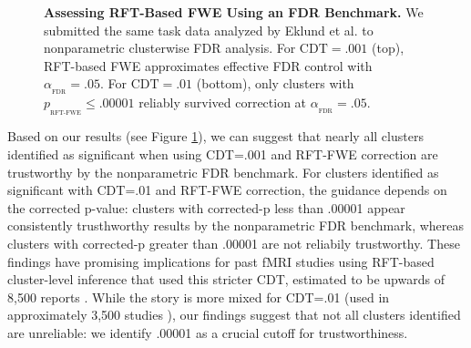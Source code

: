 \documentclass[9pt,twocolumn,twoside]{pnas-new}
\newcommand{\subtext}[2]{
#1_{_{\text{#2}}}
}
\begin{document}
\begin{figure}[ht]
\centering
\caption{
\textbf{Assessing RFT-Based FWE Using an FDR Benchmark.}
We submitted the same task data analyzed by Eklund et al. \cite{eklund_cluster_2016,tom_neural_2007,poldrack_toward_2013} to nonparametric clusterwise FDR analysis. For $\text{CDT}=.001$ (top), RFT-based FWE approximates effective FDR control with $\subtext{\alpha}{FDR} = .05$. For $\text{CDT}=.01$ (bottom), only clusters with $\subtext{p}{RFT-FWE} \leq .00001$ reliably survived correction at $\subtext{\alpha}{FDR}=.05$. 
\label{fig:p-plot}
}
\end{figure}

Based on our results (see Figure \ref{fig:p-plot}), we can suggest that nearly all clusters identified as significant when using CDT=.001 and RFT-FWE correction are trustworthy by the nonparametric FDR benchmark.
For clusters identified as significant with CDT=.01 and RFT-FWE correction, the guidance depends on the corrected p-value: clusters with corrected-p less than .00001 appear consistently trusthworthy results by the nonparametric FDR benchmark, whereas clusters with corrected-p greater than .00001 are not reliabily trustworthy.
These findings have promising implications for past fMRI studies using RFT-based cluster-level inference that used this stricter CDT, estimated to be upwards of 8,500 reports \cite{nichols_bibliometrics_2016,woo_cluster-extent_2014}.
While the story is more mixed for CDT=.01 (used in approximately 3,500 studies \cite{nichols_bibliometrics_2016,woo_cluster-extent_2014}), our findings suggest that not all clusters identified are unreliable: we identify .00001 as a crucial cutoff for trustworthiness.
\end{document}
